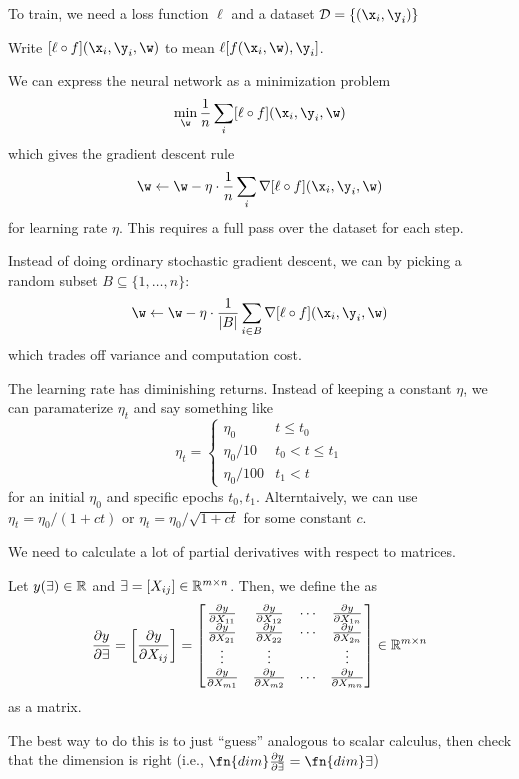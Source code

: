 \documentclass[class=cs480,notes,tikz]{agony}
\begin{document}
To train, we need a loss function $\ell$ and a dataset $\mathcal D = \{ (\x_i,\y_i) \}$

\begin{notation}
  Write $[\ell \circ f](\x_i,\y_i,\w)$ to mean $\ell[f(\x_i,\w),\y_i]$.
\end{notation}

We can express the neural network as a minimization problem
\begin{equation}
  \min_{\w} \frac1n \sum_i [\ell \circ f](\x_i,\y_i,\w)
\end{equation}
which gives the gradient descent rule
\[
  \w \gets \w - \eta \cdot \frac1n \sum_i \nabla[\ell \circ f](\x_i,\y_i,\w)
\]
for learning rate $\eta$.
This requires a full pass over the dataset for each step.

Instead of doing ordinary stochastic gradient descent,
we can  by picking a random subset $B \subseteq \{1,\dotsc,n\}$:
\[
  \w \gets \w - \eta \cdot \frac{1}{\abs{B}} \sum_{i \in B} \nabla[\ell \circ f](\x_i,\y_i,\w)
\]
which trades off variance and computation cost.


The learning rate has diminishing returns.
Instead of keeping a constant $\eta$, we can paramaterize $\eta_t$
and say something like
\[
  \eta_t = \begin{cases}
    \eta_0     & t \leq t_0       \\
    \eta_0/10  & t_0 < t \leq t_1 \\
    \eta_0/100 & t_1 < t
  \end{cases}
\]
for an initial $\eta_0$ and specific epochs $t_0,t_1$.
Alterntaively, we can use  $\eta_t = \eta_0/(1+ct)$
or $\eta_t = \eta_0/\sqrt{1+ct}$ for some constant $c$.

We need to calculate a lot of partial derivatives with respect to matrices.
\begin{defn}
  Let $y(\exists\!\,) \in \mathbb{R}$ and $\exists\!\, = [X_{ij}] \in \mathbb{R}^{m \times n}$.
  Then, we define the  as
  \[
    \pdv{y}{\ensuremath{\exists}\!\,} = \qty[\pdv{y}{X_{ij}}] = \begin{bmatrix}
      \pdv{y}{X_{11}} & \pdv{y}{X_{12}} & \cdots & \pdv{y}{X_{1n}} \\
      \pdv{y}{X_{21}} & \pdv{y}{X_{22}} & \cdots & \pdv{y}{X_{2n}} \\
      \vdots          & \vdots          &        & \vdots          \\
      \pdv{y}{X_{m1}} & \pdv{y}{X_{m2}} & \cdots & \pdv{y}{X_{mn}}
    \end{bmatrix} \in \mathbb{R}^{m \times n}
  \]
  as a matrix.
\end{defn}
The best way to do this is to just ``guess'' analogous to scalar calculus,
then check that the dimension is right (i.e., $\fn{dim} \pdv{y}{\X} = \fn{dim} \X$)
\end{document}
